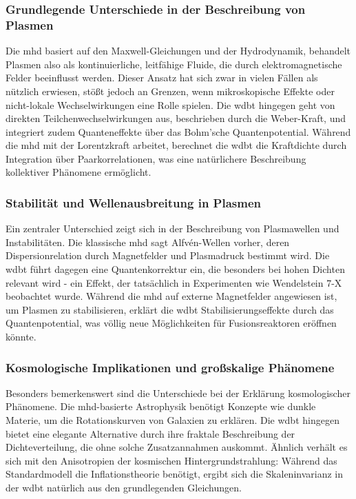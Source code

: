 \subsubsection{Grundlegende Unterschiede in der Beschreibung von Plasmen}
Die \gls{mhd} basiert auf den Maxwell-Gleichungen und der Hydrodynamik, behandelt Plasmen also als kontinuierliche, leitfähige Fluide, die durch elektromagnetische Felder
beeinflusst werden. Dieser Ansatz hat sich zwar in vielen Fällen als nützlich erwiesen, stößt jedoch an Grenzen, wenn mikroskopische Effekte oder nicht-lokale Wechselwirkungen
eine Rolle spielen. Die \gls{wdbt} hingegen geht von direkten Teilchenwechselwirkungen aus, beschrieben durch die Weber-Kraft, und integriert zudem Quanteneffekte über das
Bohm'sche Quantenpotential. Während die \gls{mhd} mit der Lorentzkraft arbeitet, berechnet die \gls{wdbt} die Kraftdichte durch Integration über Paarkorrelationen, was eine
natürlichere Beschreibung kollektiver Phänomene ermöglicht.

\subsubsection{Stabilität und Wellenausbreitung in Plasmen}
Ein zentraler Unterschied zeigt sich in der Beschreibung von Plasmawellen und Instabilitäten. Die klassische \gls{mhd} sagt Alfvén-Wellen vorher, deren Dispersionrelation durch
Magnetfelder und Plasmadruck bestimmt wird. Die \gls{wdbt} führt dagegen eine Quantenkorrektur ein, die besonders bei hohen Dichten relevant wird - ein Effekt, der tatsächlich in
Experimenten wie Wendelstein 7-X beobachtet wurde. Während die \gls{mhd} auf externe Magnetfelder angewiesen ist, um Plasmen zu stabilisieren, erklärt die \gls{wdbt}
Stabilisierungseffekte durch das Quantenpotential, was völlig neue Möglichkeiten für Fusionsreaktoren eröffnen könnte.

\subsubsection{Kosmologische Implikationen und großskalige Phänomene}
Besonders bemerkenswert sind die Unterschiede bei der Erklärung kosmologischer Phänomene. Die \gls{mhd}-basierte Astrophysik benötigt Konzepte wie dunkle Materie, um die
Rotationskurven von Galaxien zu erklären. Die \gls{wdbt} hingegen bietet eine elegante Alternative durch ihre fraktale Beschreibung der Dichteverteilung, die ohne solche
Zusatzannahmen auskommt. Ähnlich verhält es sich mit den Anisotropien der kosmischen Hintergrundstrahlung: Während das Standardmodell die Inflationstheorie benötigt, ergibt sich
die Skaleninvarianz in der \gls{wdbt} natürlich aus den grundlegenden Gleichungen.

